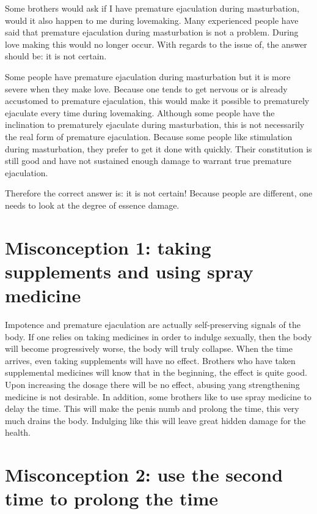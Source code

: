 \documentclass[
]{book}
\begin{document}
Some brothers would ask if I have premature ejaculation during masturbation, would it also happen to me during lovemaking. Many experienced people have said that premature ejaculation during masturbation is not a problem. During love making this would no longer occur. With regards to the issue of, the answer should be: it is not certain.

Some people have premature ejaculation during masturbation but it is more severe when they make love. Because one tends to get nervous or is already accustomed to premature ejaculation, this would make it possible to prematurely ejaculate every time during lovemaking. Although some people have the inclination to prematurely ejaculate during masturbation, this is not necessarily the real form of premature ejaculation. Because some people like stimulation during masturbation, they prefer to get it done with quickly. Their constitution is still good and have not sustained enough damage to warrant true premature ejaculation.

Therefore the correct answer is: it is not certain! Because people are different, one needs to look at the degree of essence damage.

\hypertarget{misconception-1-taking-supplements-and-using-spray-medicine}{%
\section{Misconception 1: taking supplements and using spray medicine}\label{misconception-1-taking-supplements-and-using-spray-medicine}}

Impotence and premature ejaculation are actually self-preserving signals of the body. If one relies on taking medicines in order to indulge sexually, then the body will become progressively worse, the body will truly collapse. When the time arrives, even taking supplements will have no effect. Brothers who have taken supplemental medicines will know that in the beginning, the effect is quite good. Upon increasing the dosage there will be no effect, abusing yang strengthening medicine is not desirable. In addition, some brothers like to use spray medicine to delay the time. This will make the penis numb and prolong the time, this very much drains the body. Indulging like this will leave great hidden damage for the health.

\hypertarget{misconception-2-use-the-second-time-to-prolong-the-time}{%
\section{Misconception 2: use the second time to prolong the time}\label{misconception-2-use-the-second-time-to-prolong-the-time}}
\end{document}
